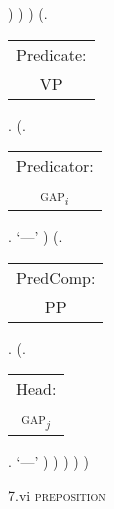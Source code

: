 \documentclass[12pt,letterpaper]{article}
\begin{document}
\begin{figure}
\begin{center}
\begin{parsetree}
			)
			)
			)
			(.\begin{tabular}{c}Predicate:\\VP\end{tabular}.
			(.\begin{tabular}{c}Predicator:\\\textsc{gap}$_i$\end{tabular}. `---' )
			(.\begin{tabular}{c}PredComp:\\PP\end{tabular}. 
			(.\begin{tabular}{c}Head:\\\textsc{gap}$_j$\end{tabular}. `{---}' )
			)
			)
			)
			)
			
			\hfill \break\hfill \break
		\end{parsetree}
		7.vi \textsc{preposition}
	\end{center}
\end{figure}
			
\end{document}
